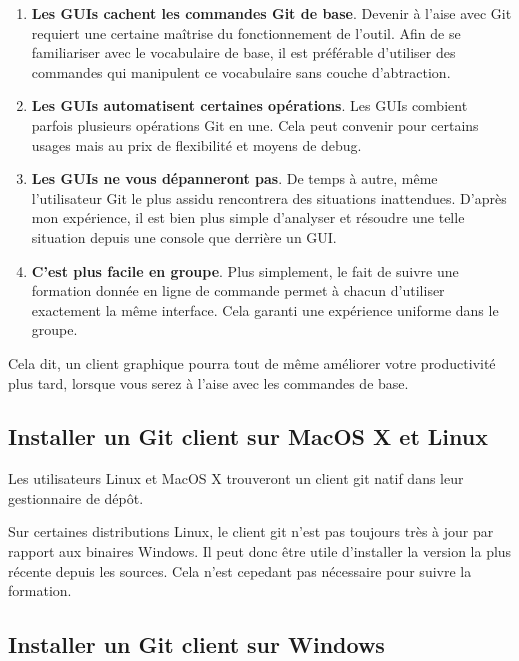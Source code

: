 \documentclass[a4paper]{../../common/tufte-latex/tufte-handout}
\begin{document}
\begin{enumerate} 
 \item{\textbf{Les GUIs cachent les commandes Git de base}. Devenir à l'aise avec Git requiert une certaine maîtrise du fonctionnement de l'outil. Afin de se familiariser avec le vocabulaire de base, il est préférable d'utiliser des commandes qui manipulent ce vocabulaire sans couche d'abtraction.}
 \item{\textbf{Les GUIs automatisent certaines opérations}. 
 Les GUIs combient parfois plusieurs opérations Git en une. Cela peut convenir pour certains usages mais au prix de flexibilité et moyens de debug.}
 \item{\textbf{Les GUIs ne vous dépanneront pas}. 
 De temps à autre, même l'utilisateur Git le plus assidu rencontrera des situations inattendues. D'après mon expérience, il est bien plus simple d'analyser et résoudre une telle situation depuis une console que derrière un GUI.}
 \item{\textbf{C'est plus facile en groupe}. Plus simplement, le fait de suivre une formation donnée en ligne de commande permet à chacun d'utiliser exactement la même interface. Cela garanti une expérience uniforme dans le groupe.}
\end{enumerate}

Cela dit, un client graphique pourra tout de même améliorer votre productivité plus tard, lorsque vous serez à l'aise avec les commandes de base.

\subsection{Installer un Git client sur MacOS X et Linux}

Les utilisateurs Linux et MacOS X trouveront un client git natif dans leur gestionnaire de dépôt.

Sur certaines distributions Linux, le client git n'est pas toujours très à jour par rapport aux binaires Windows.  Il peut donc être utile d'installer la version la plus récente depuis les sources. Cela n'est cepedant pas nécessaire pour suivre la formation.

\subsection{Installer un Git client sur Windows}\label{sec:preparation}
\end{document}
